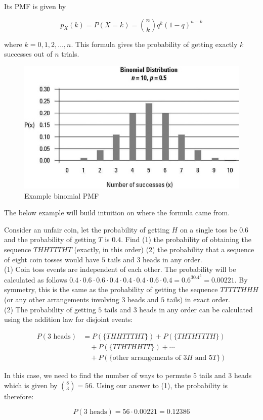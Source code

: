 Its PMF is given by

$$p_X(k)=P(X=k)={n \choose k} q^k(1-q)^{n-k}$$

where $k=0, 1, 2, \dots, n$. This formula gives the probability of getting exactly $k$ successes out of $n$ trials. \\

\begin{figure}[H]
	\centering
	\includegraphics[width=120mm]{10.jpg}
	\caption{Example binomial PMF}
\end{figure}

The below example will build intuition on where the formula came from.

\begin{texample}
	Consider an unfair coin, let the probability of getting $H$ on a single toss be $0.6$ and the probability of getting $T$ is $0.4$. Find (1) the probability of obtaining the sequence $THHTTTHT$ (exactly, in this order) (2) the probability that a sequence of eight coin tosses would have $5$ tails and $3$ heads in any order. \\
	
	(1) Coin toss events are independent of each other. The probability will be calculated as follows $0.4\cdot0.6\cdot0.6\cdot0.4\cdot0.4\cdot0.4\cdot0.6\cdot0.4=0.6^30.4^5=0.00221$. By symmetry, this is the same as the probability of getting the sequence $TTTTTHHH$ (or any other arrangements involving $3$ heads and $5$ tails) in exact order. \\
	
	(2) The probability of getting $5$ tails and $3$ heads in any order can be calculated using the addition law for disjoint events:
	
	\begin{align*}
		P(\text{$3$ heads})&=P(\{THHTTTHT\}) + P(\{THTHTTTH\}) \\
		&\quad+ P(\{TTHTHHTT\}) + \cdots \\
		&\quad + P(\{\text{other arrangements of $3H$ and $5T$}\})
	\end{align*}
	
	In this case, we need to find the number of ways to permute $5$ tails and $3$ heads which is given by $\binom{8}{3}=56$. Using our answer to (1), the probability is therefore:
	
	$$P(\text{$3$ heads})=56\cdot0.00221=0.12386$$
\end{texample}

